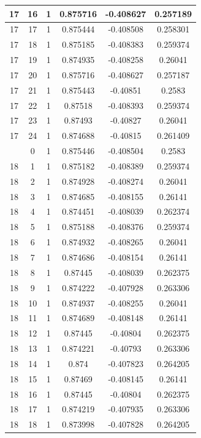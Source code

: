 \documentclass[12pt,a4paper]{article}
\numberwithin{equation}{section}
\numberwithin{figure}{section}
\numberwithin{table}{section}
\begin{document}
\begin{longtable}{|c|c|c|c|c|c|}
17 & 16 & 1 & 0.875716 & -0.408627 & 0.257189 \\ \hline
17 & 17 & 1 & 0.875444 & -0.408508 & 0.258301 \\ \hline
17 & 18 & 1 & 0.875185 & -0.408383 & 0.259374 \\ \hline
17 & 19 & 1 & 0.874935 & -0.408258 & 0.26041 \\ \hline
17 & 20 & 1 & 0.875716 & -0.408627 & 0.257187 \\ \hline
17 & 21 & 1 & 0.875443 & -0.40851 & 0.2583 \\ \hline
17 & 22 & 1 & 0.87518 & -0.408393 & 0.259374 \\ \hline
17 & 23 & 1 & 0.87493 & -0.40827 & 0.26041 \\ \hline
17 & 24 & 1 & 0.874688 & -0.40815 & 0.261409 \\ \hline
\pagebreak
18 & 0 & 1 & 0.875446 & -0.408504 & 0.2583 \\ \hline
18 & 1 & 1 & 0.875182 & -0.408389 & 0.259374 \\ \hline
18 & 2 & 1 & 0.874928 & -0.408274 & 0.26041 \\ \hline
18 & 3 & 1 & 0.874685 & -0.408155 & 0.26141 \\ \hline
18 & 4 & 1 & 0.874451 & -0.408039 & 0.262374 \\ \hline
18 & 5 & 1 & 0.875188 & -0.408376 & 0.259374 \\ \hline
18 & 6 & 1 & 0.874932 & -0.408265 & 0.26041 \\ \hline
18 & 7 & 1 & 0.874686 & -0.408154 & 0.26141 \\ \hline
18 & 8 & 1 & 0.87445 & -0.408039 & 0.262375 \\ \hline
18 & 9 & 1 & 0.874222 & -0.407928 & 0.263306 \\ \hline
18 & 10 & 1 & 0.874937 & -0.408255 & 0.26041 \\ \hline
18 & 11 & 1 & 0.874689 & -0.408148 & 0.26141 \\ \hline
18 & 12 & 1 & 0.87445 & -0.40804 & 0.262375 \\ \hline
18 & 13 & 1 & 0.874221 & -0.40793 & 0.263306 \\ \hline
18 & 14 & 1 & 0.874 & -0.407823 & 0.264205 \\ \hline
18 & 15 & 1 & 0.87469 & -0.408145 & 0.26141 \\ \hline
18 & 16 & 1 & 0.87445 & -0.40804 & 0.262375 \\ \hline
18 & 17 & 1 & 0.874219 & -0.407935 & 0.263306 \\ \hline
18 & 18 & 1 & 0.873998 & -0.407828 & 0.264205 \\ \hline

\end{longtable}
\end{document}
